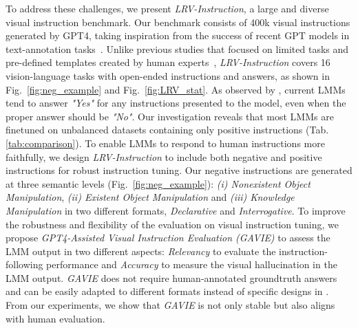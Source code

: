 To address these challenges, we present \textit{LRV-Instruction}, a large and diverse visual instruction benchmark. Our benchmark consists of 400k visual instructions generated by GPT4, taking inspiration from the success of recent GPT models in text-annotation tasks~\citep{liu2023gpteval}. Unlike previous studies that focused on limited tasks and pre-defined templates created by human experts~\citep{zhu2023minigpt, dai2023instructblip, gong2023multimodal}, \textit{LRV-Instruction} covers 16 vision-language tasks with open-ended instructions and answers, as shown in Fig.~\ref{fig:neg_example} and Fig.~\ref{fig:LRV_stat}. As observed by \citep{li2023evaluating}, current LMMs tend to answer \textit{"Yes"} for any instructions presented to the model, even when the proper answer should be \textit{"No"}. Our investigation reveals that most LMMs are finetuned on unbalanced datasets containing only positive instructions (Tab. \ref{tab:comparison}). To enable LMMs to respond to human instructions more faithfully, we design \textit{LRV-Instruction} to include both negative and positive instructions for robust instruction tuning. Our negative instructions are generated at three semantic levels (Fig.~\ref{fig:neg_example}): \textit{(i) Nonexistent Object Manipulation}, \textit{(ii) Existent Object Manipulation} and \textit{(iii) Knowledge Manipulation} in two different formats, \textit{Declarative} and \textit{Interrogative}. To improve the robustness and flexibility of the evaluation on visual instruction tuning, we propose \textit{GPT4-Assisted Visual Instruction Evaluation (GAVIE)} to assess the LMM output in two different aspects: \textit{Relevancy} to evaluate the instruction-following performance and \textit{Accuracy} to measure the visual hallucination in the LMM output. \textit{GAVIE} does not require human-annotated groundtruth answers \citep{rohrbach2018object} and can be easily adapted to different formats instead of specific designs in \citep{li2023evaluating}. From our experiments, we show that \textit{GAVIE} is not only stable but also aligns with human evaluation.

